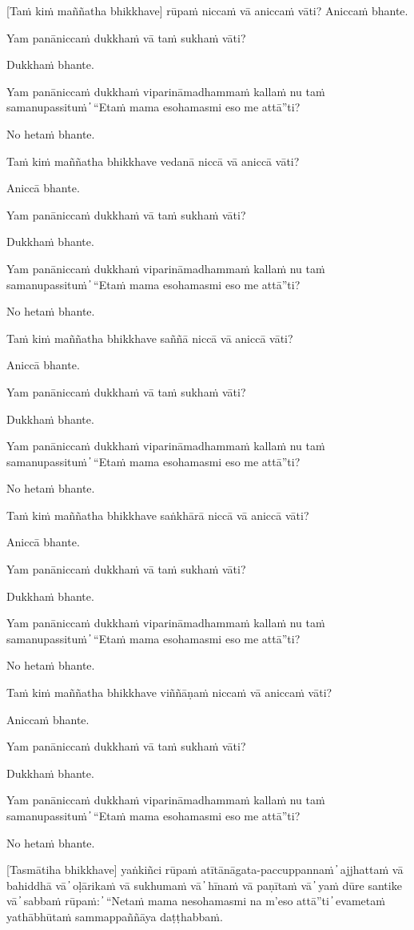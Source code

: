 [Taṁ kiṁ maññatha bhikkhave] rūpaṁ niccaṁ vā aniccaṁ vāti? Aniccaṁ bhante.

Yam panāniccaṁ dukkhaṁ vā taṁ sukhaṁ vāti?

Dukkhaṁ bhante.

Yam panāniccaṁ dukkhaṁ viparināmadhammaṁ kallaṁ nu taṁ samanupassituṁ  ̓  “Etaṁ mama esohamasmi eso me attā”ti?

No hetaṁ bhante.

Taṁ kiṁ maññatha bhikkhave vedanā niccā vā aniccā vāti?

Aniccā bhante.

Yam panāniccaṁ dukkhaṁ vā taṁ sukhaṁ vāti?

Dukkhaṁ bhante.

Yam panāniccaṁ dukkhaṁ viparināmadhammaṁ kallaṁ nu taṁ samanupassituṁ  ̓  “Etaṁ mama esohamasmi eso me attā”ti?

No hetaṁ bhante.

Taṁ kiṁ maññatha bhikkhave saññā niccā vā aniccā vāti?

Aniccā bhante.

Yam panāniccaṁ dukkhaṁ vā taṁ sukhaṁ vāti?

Dukkhaṁ bhante.

Yam panāniccaṁ dukkhaṁ viparināmadhammaṁ kallaṁ nu taṁ samanupassituṁ  ̓  “Etaṁ mama esohamasmi eso me attā”ti?

No hetaṁ bhante.

Taṁ kiṁ maññatha bhikkhave saṅkhārā niccā vā aniccā vāti?

Aniccā bhante.

Yam panāniccaṁ dukkhaṁ vā taṁ sukhaṁ vāti?

Dukkhaṁ bhante.

Yam panāniccaṁ dukkhaṁ viparināmadhammaṁ kallaṁ nu taṁ samanupassituṁ  ̓  “Etaṁ mama esohamasmi eso me attā”ti?

No hetaṁ bhante.

Taṁ kiṁ maññatha bhikkhave viññāṇaṁ niccaṁ vā aniccaṁ vāti?

Aniccaṁ bhante.

Yam panāniccaṁ dukkhaṁ vā taṁ sukhaṁ vāti?

Dukkhaṁ bhante.

Yam panāniccaṁ dukkhaṁ viparināmadhammaṁ kallaṁ nu taṁ samanupassituṁ  ̓  “Etaṁ mama esohamasmi eso me attā”ti?

No hetaṁ bhante.

[Tasmātiha bhikkhave] yaṅkiñci rūpaṁ atītānāgata-paccuppannaṁ  ̓  ajjhattaṁ vā bahiddhā vā  ̓  oḷārikaṁ vā sukhumaṁ vā  ̓  hīnaṁ vā paṇītaṁ vā  ̓  yaṁ dūre santike vā  ̓  sabbaṁ rūpaṁ:  ̓  “Netaṁ mama nesohamasmi na m’eso attā”ti  ̓  evametaṁ yathābhūtaṁ sammappaññāya daṭṭhabbaṁ.

